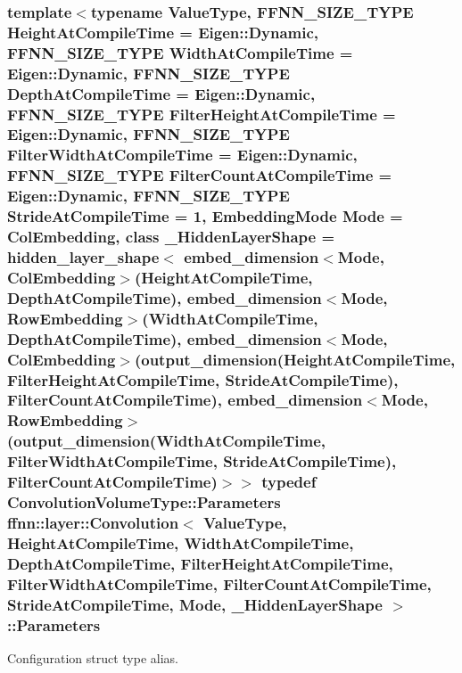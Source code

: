 \hypertarget{classffnn_1_1layer_1_1_convolution_afba43aa5946f49d3ffc306972ba11fff}{
\subsubsection[{Parameters}]{\setlength{\rightskip}{0pt plus 5cm}template$<$typename Value\-Type, F\-F\-N\-N\-\_\-\-S\-I\-Z\-E\-\_\-\-T\-Y\-P\-E Height\-At\-Compile\-Time = Eigen\-::\-Dynamic, F\-F\-N\-N\-\_\-\-S\-I\-Z\-E\-\_\-\-T\-Y\-P\-E Width\-At\-Compile\-Time = Eigen\-::\-Dynamic, F\-F\-N\-N\-\_\-\-S\-I\-Z\-E\-\_\-\-T\-Y\-P\-E Depth\-At\-Compile\-Time = Eigen\-::\-Dynamic, F\-F\-N\-N\-\_\-\-S\-I\-Z\-E\-\_\-\-T\-Y\-P\-E Filter\-Height\-At\-Compile\-Time = Eigen\-::\-Dynamic, F\-F\-N\-N\-\_\-\-S\-I\-Z\-E\-\_\-\-T\-Y\-P\-E Filter\-Width\-At\-Compile\-Time = Eigen\-::\-Dynamic, F\-F\-N\-N\-\_\-\-S\-I\-Z\-E\-\_\-\-T\-Y\-P\-E Filter\-Count\-At\-Compile\-Time = Eigen\-::\-Dynamic, F\-F\-N\-N\-\_\-\-S\-I\-Z\-E\-\_\-\-T\-Y\-P\-E Stride\-At\-Compile\-Time = 1, Embedding\-Mode Mode = Col\-Embedding, class \-\_\-\-Hidden\-Layer\-Shape = hidden\-\_\-layer\-\_\-shape$<$              embed\-\_\-dimension$<$\-Mode, Col\-Embedding$>$(\-Height\-At\-Compile\-Time, Depth\-At\-Compile\-Time),              embed\-\_\-dimension$<$\-Mode, Row\-Embedding$>$(\-Width\-At\-Compile\-Time,  Depth\-At\-Compile\-Time),              embed\-\_\-dimension$<$\-Mode, Col\-Embedding$>$(output\-\_\-dimension(\-Height\-At\-Compile\-Time, Filter\-Height\-At\-Compile\-Time, Stride\-At\-Compile\-Time), Filter\-Count\-At\-Compile\-Time),              embed\-\_\-dimension$<$\-Mode, Row\-Embedding$>$(output\-\_\-dimension(\-Width\-At\-Compile\-Time,  Filter\-Width\-At\-Compile\-Time,  Stride\-At\-Compile\-Time), Filter\-Count\-At\-Compile\-Time)$>$$>$ typedef {\bf Convolution\-Volume\-Type\-::\-Parameters} {\bf ffnn\-::layer\-::\-Convolution}$<$ Value\-Type, Height\-At\-Compile\-Time, Width\-At\-Compile\-Time, Depth\-At\-Compile\-Time, Filter\-Height\-At\-Compile\-Time, Filter\-Width\-At\-Compile\-Time, Filter\-Count\-At\-Compile\-Time, Stride\-At\-Compile\-Time, Mode, \-\_\-\-Hidden\-Layer\-Shape $>$\-::{\bf Parameters}}}\label{classffnn_1_1layer_1_1_convolution_afba43aa5946f49d3ffc306972ba11fff}


Configuration struct type alias. 

